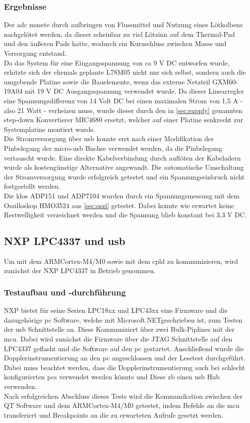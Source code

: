 \subsubsection*{Ergebnisse}
Der \ac{adc} musste durch aufbringen von Flussmittel und Nutzung eines Lötkolbens nachgelötet werden, da dieser scheinbar zu viel Lötzinn auf dem Thermal-Pad und den äußeren Pads hatte, wodurch ein Kurzschluss zwischen Masse und Versorgung entstand.\\
Da das System für eine Eingangsspannung von \ac{ca} 9 V DC entworfen wurde, erhitzte sich der ehemals geplante L78M05 nicht nur sich selbst, sondern auch die umgebende Platine sowie die Bauelemente, wenn das externe Netzteil GXM60-19A04\cite{slpower} mit 19 V DC Ausgangsspannung verwendet wurde. Da dieser Linearregler eine Spannungsdifferenz von 14 Volt DC bei einen maximalen Strom von 1,5 A - also 21 Watt - \glqq verheizen\grqq{} muss, wurde dieser durch den in \autoref{sec:supply} genannten step-down Konvertierer MIC4680 ersetzt, welcher auf einer Platine senkrecht zur Systemplatine montiert wurde.\\
Die Stromversorgung über \ac{usb} konnte erst nach einer Modifikation der Pinbelegung der micro-\ac{usb} Buchse verwendet werden, da die Pinbelegung vertauscht wurde. Eine direkte Kabelverbindung durch auflöten der Kabeladern wurde als kostengünstige Alternative angewandt. Die automatische Umschaltung der Stromversorgung wurde erfolgreich getestet und ein Spannungseinbruch nicht festgestellt werden.\\
Die \ac{ldo}s ADP151 und ADP7104 wurden durch ein Spannungsmessung mit dem Oszilloskop HMO3524 aus \autoref{sec:oszi} getestet. Dabei konnte wie erwartet keine Restwelligkeit verzeichnet werden und die Spannung blieb konstant bei 3,3 V DC.
\subsection{NXP LPC4337 und \acs{usb}}
Um mit dem ARM\SymbReg Cortex\SymbReg-M4/M0 sowie mit dem \ac{cpld} zu kommunizieren, wird zunächst der NXP LPC4337 in Betrieb genommen.
\subsubsection*{Testaufbau und -durchführung}
NXP bietet für seine Serien LPC18xx und LPC43xx eine Firmware und die dazugehörige \ac{pc} Software, welche mit Microsoft\SymbC .NET\SymbReg geschrieben ist, zum Testen der \ac{usb} Schnittstelle an\cite{nxpusblib}. Diese Kommuniziert über zwei Bulk-Piplines mit der \ac{mcu}. Dabei wird zunächst die Firmware über die JTAG Schnittstelle auf den LPC4337 geflasht und die Software auf den \ac{pc} gestartet. Anschließend wurde die Dopplerinstrumentierung an den \ac{pc} angeschlossen und der Lesetest durchgeführt. Dabei muss beachtet werden, dass die Dopplerinstrumentierung auch bei schlecht konfigurierten \ac{pc}s verwendet werden könnte und Diese \ac{zb} einen \ac{usb} Hub verwenden.\\
Nach erfolgreichen Abschluss dieses Tests wird die Kommunikation zwischen der QT Software und dem ARM\SymbReg Cortex\SymbReg-M4/M0 getestet, indem Befehle an die \ac{mcu} transferiert und Breakpoints an die zu erwarteten Aufrufe gesetzt werden.
